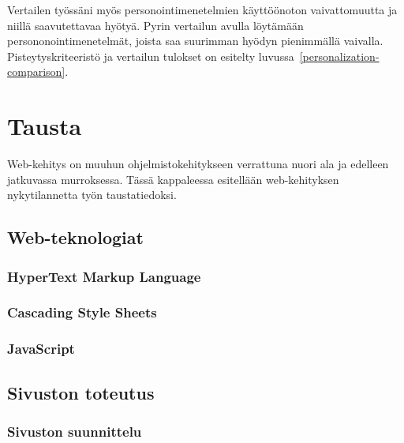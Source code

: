 \documentclass[finnish, 12pt, a4paper, elec, utf8, a-1b, online]{aaltothesis}
\begin{document}
Vertailen työssäni myös personointimenetelmien käyttöönoton vaivattomuutta ja
niillä saavutettavaa hyötyä. Pyrin vertailun avulla löytämään
persononointimenetelmät, joista saa suurimman hyödyn pienimmällä vaivalla.
Pisteytyskriteeristö ja vertailun tulokset on esitelty
luvussa~\ref{personalization-comparison}.

\clearpage

\section{Tausta}\label{background}

Web-kehitys on muuhun ohjelmistokehitykseen verrattuna nuori ala ja
edelleen jatkuvassa murroksessa. Tässä kappaleessa esitellään web-kehityksen
nykytilannetta työn taustatiedoksi.

\subsection{Web-teknologiat}

\subsubsection{HyperText Markup Language}

\subsubsection{Cascading Style Sheets}

\subsubsection{JavaScript}

\subsection{Sivuston toteutus}

\subsubsection{Sivuston suunnittelu}
\end{document}
